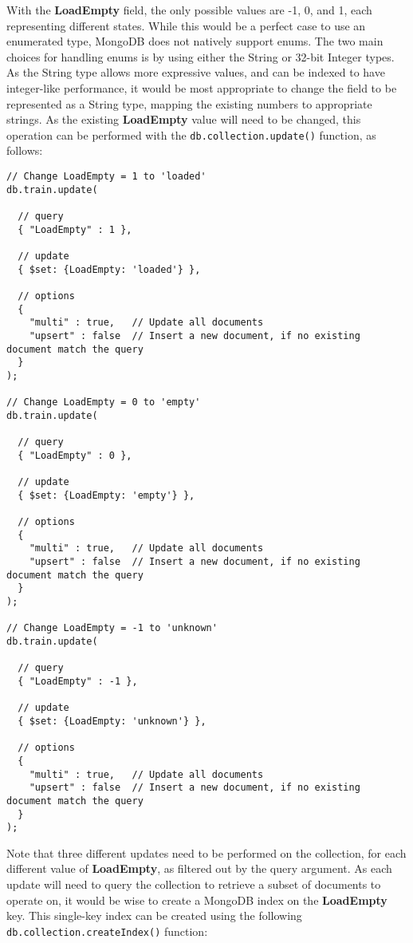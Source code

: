 \documentclass[a4paper,11pt]{article}
\begin{document}
With the \textbf{LoadEmpty} field, the only possible values are -1, 0, and 1, each representing different states. While
this would be a perfect case to use an enumerated type, MongoDB does not natively support enums. The two main choices
for handling enums is by using either the String or 32-bit Integer types. As the String type allows more expressive
values, and can be indexed to have integer-like performance, it would be most appropriate to change the field to be
represented as a String type, mapping the existing numbers to appropriate strings. As the existing \textbf{LoadEmpty}
value will need to be changed, this operation can be performed with the \texttt{db.collection.update()} function, as
follows:

\begin{lstlisting}[caption=Performing asynchronous \texttt{update()} operations on ``train'' collection.]
// Change LoadEmpty = 1 to 'loaded'
db.train.update(

  // query
  { "LoadEmpty" : 1 },

  // update
  { $set: {LoadEmpty: 'loaded'} },

  // options
  {
    "multi" : true,   // Update all documents
    "upsert" : false  // Insert a new document, if no existing document match the query
  }
);

// Change LoadEmpty = 0 to 'empty'
db.train.update(

  // query
  { "LoadEmpty" : 0 },

  // update
  { $set: {LoadEmpty: 'empty'} },

  // options
  {
    "multi" : true,   // Update all documents
    "upsert" : false  // Insert a new document, if no existing document match the query
  }
);

// Change LoadEmpty = -1 to 'unknown'
db.train.update(

  // query
  { "LoadEmpty" : -1 },

  // update
  { $set: {LoadEmpty: 'unknown'} },

  // options
  {
    "multi" : true,   // Update all documents
    "upsert" : false  // Insert a new document, if no existing document match the query
  }
);
\end{lstlisting}

Note that three different updates need to be performed on the collection, for each different value of \textbf{LoadEmpty},
as filtered out by the query argument. As each update will need to query the collection to retrieve a subset of documents
to operate on, it would be wise to create a MongoDB index on the \textbf{LoadEmpty} key. This single-key index can be
created using the following \texttt{db.collection.createIndex()} function:
\end{document}
